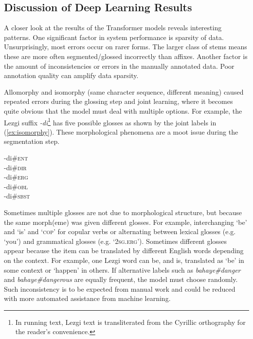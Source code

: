 \subsection{Discussion of Deep Learning Results}
\label{sec:sgDLanalysis}

A closer look at the results of the Transformer models reveals interesting patterns. One significant factor in system performance is sparsity of data. Unsurprisingly, most errors occur on rarer forms. The larger class of stems means these are more often segmented/glossed incorrectly than affixes. Another factor is the amount of inconsistencies or errors in the manually annotated data. Poor annotation quality can amplify data sparsity. 

Allomorphy and isomorphy (same character sequence, different meaning) caused repeated errors during the glossing step and joint learning, where it becomes quite obvious that the model must deal with multiple options. For example, the Lezgi suffix \textit{-di}\footnote{In running text, Lezgi text is transliterated from the Cyrillic orthography for the reader's convenience.} has five possible glosses as shown by the joint labels in (\ref{ex:isomorphy}). These morphological phenomena are a moot issue during the segmentation step. 

\pex   
\label{ex:isomorphy}
-di\#\textsc{ent} \\
-di\#\textsc{dir} \\
-di\#\textsc{erg} \\
-di\#\textsc{obl} \\
-di\#\textsc{sbst} 
\xe

Sometimes multiple glosses are not due to morphological structure, but because the same morph(eme) was given different glosses. For example, interchanging `be' and `is' and `\textsc{cop}' for copular verbs or alternating between lexical glosses (e.g. `you') and grammatical glosses (e.g. `\textsc{2sg.erg}'). Sometimes different glosses appear because the item can be translated by different English words depending on the context. For example, one Lezgi word can be, and is, translated as `be' in some context or `happen' in others. If alternative labels such as \textit{bahaye\#danger} and \textit{bahaye\#dangerous} are equally frequent, the model must choose randomly. Such inconsistency is to be expected from manual work and could be reduced with more automated assistance from machine learning.


